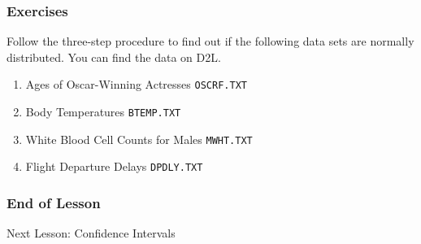 \documentclass[xcolor=dvipsnames]{beamer}
\begin{document}
\begin{frame}
  \frametitle{Exercises}
  {\ubung} Follow the three-step procedure to find out if the
  following data sets are normally distributed. You can find the
  data on D2L.
  \begin{enumerate}
  \item Ages of Oscar-Winning Actresses \texttt{OSCRF.TXT}
  \item Body Temperatures \texttt{BTEMP.TXT}
  \item White Blood Cell Counts for Males \texttt{MWHT.TXT}
  \item Flight Departure Delays \texttt{DPDLY.TXT}
  \end{enumerate}
\end{frame}

\begin{frame}
  \frametitle{End of Lesson}
Next Lesson: Confidence Intervals
\end{frame}
\end{document}
